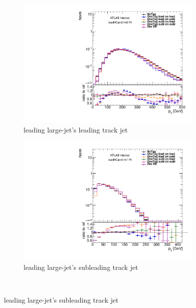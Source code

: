 \begin{figure}[htb!]
  \centering
  \captionsetup{justification=centering}
    \begin{subfigure}[b]{0.4\textwidth}
        \includegraphics[width=\textwidth,angle=-90]{figures/boosted/Prereweight/2bs_directcompare_leadHCand_trk0_Pt_1.pdf}
        \caption{leading large-\R jet's leading track jet \pt}
        \label{fig:rw-2bs-comp-lead0}
    \end{subfigure}
    \quad \quad 
    \begin{subfigure}[b]{0.4\textwidth}
        \includegraphics[width=\textwidth,angle=-90]{figures/boosted/Prereweight/2bs_directcompare_leadHCand_trk1_Pt_1.pdf}
        \caption{leading large-\R jet's subleading track jet \pt}
        \label{fig:rw-2bs-comp-lead1}
    \end{subfigure} \\ 

\end{figure}
